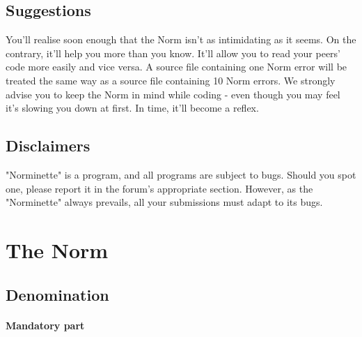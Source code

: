 \documentclass{42-en}
\begin{document}
    \section{Suggestions}

        You'll realise soon enough that the Norm isn't as intimidating
        as it seems. On the contrary, it'll help you more than you
        know. It'll allow you to read your peers' code more easily
        and vice versa. A source file containing one Norm error will be
        treated the same way as a source file containing 10 Norm errors.
        We strongly advise you to keep the Norm in mind while coding
        - even though you may feel it's slowing you down at first. In
        time, it'll become a reflex.


    \section{Disclaimers}

        "Norminette" is a program, and all programs are subject to
        bugs. Should you spot one, please report it in the forum's
        appropriate section. However, as the "Norminette" always
        prevails, all your submissions must adapt to its bugs.



\chapter{The Norm}


    \section{Denomination}

        \subsubsection{Mandatory part}
\end{document}
